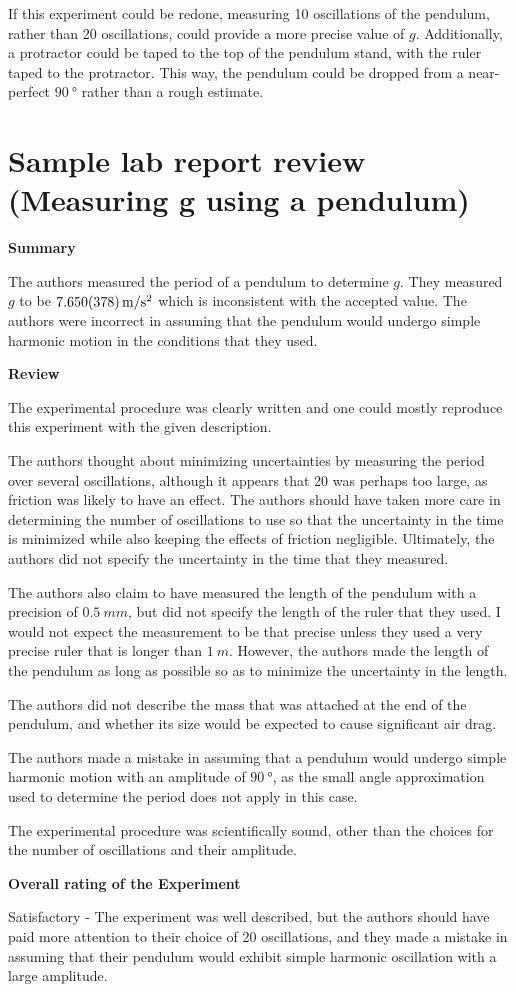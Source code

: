 If this experiment could be redone, measuring 10 oscillations of the pendulum, rather than 20 oscillations, could provide a more precise value of $g$. Additionally, a protractor could be taped to the top of the pendulum stand, with the ruler taped to the protractor. This way, the pendulum could be dropped from a near-perfect $\SI{90}{\degree}$ rather than a rough estimate. 

\newpage
\section{Sample lab report review (Measuring g using a pendulum)}
 \vspace{0.25cm}
\textbf{Summary}

The authors measured the period of a pendulum to determine $g$. They measured $g$ to be $\SI{7.65\pm0.378}{m/s^2}$ which is inconsistent with the accepted value. The authors were incorrect in assuming that the pendulum would undergo simple harmonic motion in the conditions that they used.

\textbf{Review}

The experimental procedure was clearly written and one could mostly reproduce this experiment with the given description.

The authors thought about minimizing uncertainties by measuring the period over several oscillations, although it appears that 20 was perhaps too large, as friction was likely to have an effect. The authors should have taken more care in determining the number of oscillations to use so that the uncertainty in the time is minimized while also keeping the effects of friction negligible. Ultimately, the authors did not specify the uncertainty in the time that they measured.

The authors also claim to have measured the length of the pendulum with a precision of $\SI{0.5}{mm}$, but did not specify the length of the ruler that they used. I would not expect the measurement to be that precise unless they used a very precise ruler that is longer than $\SI{1}{m}$. However, the authors made the length of the pendulum as long as possible so as to minimize the uncertainty in the length.

The authors did not describe the mass that was attached at the end of the pendulum, and whether its size would be expected to cause significant air drag.

The authors made a mistake in assuming that a pendulum would undergo simple harmonic motion with an amplitude of $\SI{90}{\degree}$, as the small angle approximation used to determine the period does not apply in this case.

The experimental procedure was scientifically sound, other than the choices for the number of oscillations and their amplitude.

\textbf{Overall rating of the Experiment}

Satisfactory - The experiment was well described, but the authors should have paid more attention to their choice of 20 oscillations, and they made a mistake in assuming that their pendulum would exhibit simple harmonic oscillation with a large amplitude.

